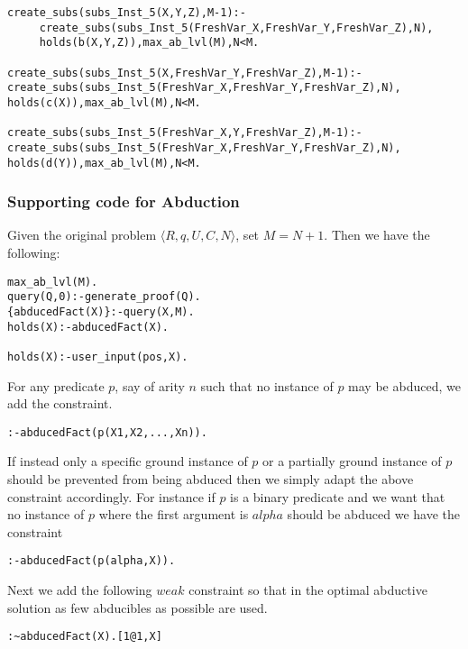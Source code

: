 \documentclass[sigconf]{acmart}
\begin{document}
\begin{lstlisting}[frame=none]
create_subs(subs_Inst_5(X,Y,Z),M-1):-
     create_subs(subs_Inst_5(FreshVar_X,FreshVar_Y,FreshVar_Z),N), 
     holds(b(X,Y,Z)),max_ab_lvl(M),N<M.

create_subs(subs_Inst_5(X,FreshVar_Y,FreshVar_Z),M-1):-
create_subs(subs_Inst_5(FreshVar_X,FreshVar_Y,FreshVar_Z),N), holds(c(X)),max_ab_lvl(M),N<M.

create_subs(subs_Inst_5(FreshVar_X,Y,FreshVar_Z),M-1):-
create_subs(subs_Inst_5(FreshVar_X,FreshVar_Y,FreshVar_Z),N), holds(d(Y)),max_ab_lvl(M),N<M.
\end{lstlisting}

\subsubsection{Supporting code for Abduction} 
Given the original problem $\langle R,q,U,C,N\rangle$, set $M=N+1$. Then we have the following: 
\begin{verbatim}
max_ab_lvl(M).
query(Q,0):-generate_proof(Q).
{abducedFact(X)}:-query(X,M).
holds(X):-abducedFact(X).

holds(X):-user_input(pos,X).
\end{verbatim}
For any predicate $p$, say of arity $n$ such that no instance of $p$ may be abduced, we add the constraint.
\begin{verbatim} 
:-abducedFact(p(X1,X2,...,Xn)).
\end{verbatim}
If instead only a specific ground instance of $p$ or a partially ground instance of $p$ should be prevented from being abduced then we simply adapt the above constraint accordingly. For instance if $p$ is a binary predicate and we want that no instance of $p$ where the first argument is $alpha$ should be abduced we have the constraint
\begin{verbatim} 
:-abducedFact(p(alpha,X)).
\end{verbatim}
Next we add the following $weak$ constraint so that in the optimal abductive
solution as few abducibles as possible are used.
\begin{verbatim} 
:~abducedFact(X).[1@1,X]
\end{verbatim}
\end{document}
